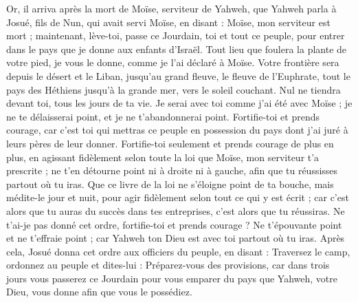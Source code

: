 \begin{multicols}{2}
\VerseOne{}Or, il arriva après la mort de Moïse, serviteur de Yahweh, que Yahweh parla à Josué, fils de Nun, qui avait servi Moïse, en disant :
Moïse, mon serviteur est mort ; maintenant, lève-toi, passe ce Jourdain, toi et tout ce peuple, pour entrer dans le pays que je donne aux enfants d’Israël.
Tout lieu que foulera la plante de votre pied, je vous le donne, comme je l’ai déclaré à Moïse.
Votre frontière sera depuis le désert et le Liban, jusqu’au grand fleuve, le fleuve de l’Euphrate, tout le pays des Héthiens jusqu’à la grande mer, vers le soleil couchant.
Nul ne tiendra devant toi, tous les jours de ta vie. Je serai avec toi comme j’ai été avec Moïse ; je ne te délaisserai point, et je ne t’abandonnerai point.
Fortifie-toi et prends courage, car c’est toi qui mettras ce peuple en possession du pays dont j’ai juré à leurs pères de leur donner.
Fortifie-toi seulement et prends courage de plus en plus, en agissant fidèlement selon toute la loi que Moïse, mon serviteur t’a prescrite ; ne t’en détourne point ni à droite ni à gauche, afin que tu réussisses partout où tu iras.
Que ce livre de la loi ne s’éloigne point de ta bouche, mais médite-le jour et nuit, pour agir fidèlement selon tout ce qui y est écrit ; car c’est alors que tu auras du succès dans tes entreprises, c’est alors que tu réussiras.
Ne t’ai-je pas donné cet ordre, fortifie-toi et prends courage ? Ne t’épouvante point et ne t’effraie point ; car Yahweh ton Dieu est avec toi partout où tu iras.
Après cela, Josué donna cet ordre aux officiers du peuple, en disant :
Traversez le camp, ordonnez au peuple et dites-lui : Préparez-vous des provisions, car dans trois jours vous passerez ce Jourdain pour vous emparer du pays que Yahweh, votre Dieu, vous donne afin que vous le possédiez.

\end{multicols}
